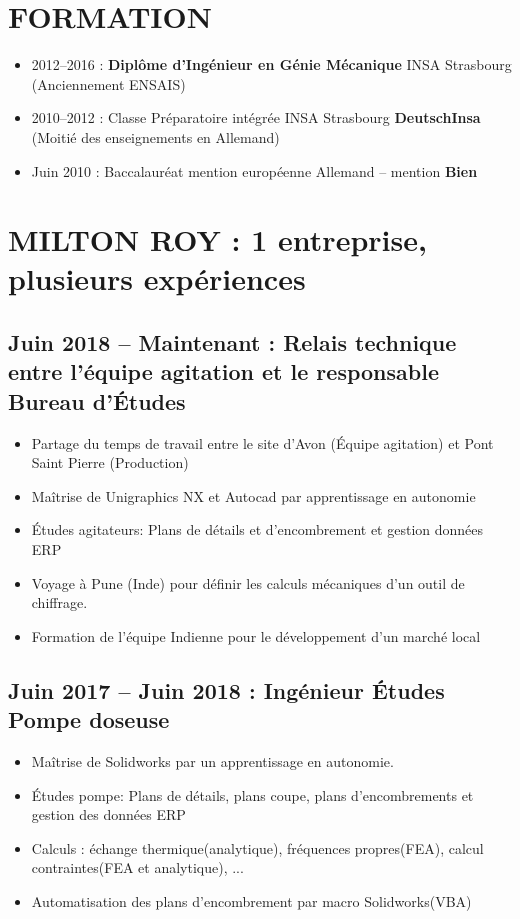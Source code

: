 \documentclass[10pt,a4paper,sans]{article}
\begin{document}
\begin{minipage}[t]{0.68\textwidth}
    \vspace{0.15cm}
    \section{FORMATION}
        \begin{itemize}
            \item{2012--2016 : \textbf{Diplôme d'Ingénieur en Génie Mécanique} INSA Strasbourg (Anciennement ENSAIS)}
            \item{2010--2012 : Classe Préparatoire intégrée INSA Strasbourg \textbf{DeutschInsa} \newline (Moitié des enseignements en Allemand)}
            \item{Juin 2010 : Baccalauréat mention européenne Allemand -- mention \textbf{Bien}}
        \end{itemize}

    \section{MILTON ROY : 1 entreprise, plusieurs expériences}
    \subsection{Juin 2018 -- Maintenant : Relais technique entre l'équipe agitation et le responsable Bureau d'Études}
    \begin{itemize}%
        \item{Partage du temps de travail entre le site d’Avon (Équipe agitation) et Pont Saint Pierre (Production)}
        \item{Maîtrise de Unigraphics NX et Autocad par apprentissage en autonomie}
        \item{Études agitateurs: Plans de détails et d'encombrement et gestion données ERP }
        \item{Voyage à Pune (Inde) pour définir les calculs mécaniques d'un outil de chiffrage.} 
        \item{Formation de l’équipe Indienne pour le développement d’un marché local}
    \end{itemize}

    \subsection{Juin 2017 -- Juin 2018 : Ingénieur Études Pompe doseuse}
    \begin{itemize}
        \item{Maîtrise de Solidworks par un apprentissage en autonomie.}
        \item{Études pompe: Plans de détails, plans coupe, plans d’encombrements et gestion des données ERP}
        \item{Calculs : échange thermique(analytique), fréquences propres(FEA), calcul contraintes(FEA et analytique), ...}
        \item{Automatisation des plans d’encombrement par macro Solidworks(VBA)}
    \end{itemize}


\end{minipage}
\end{document}
